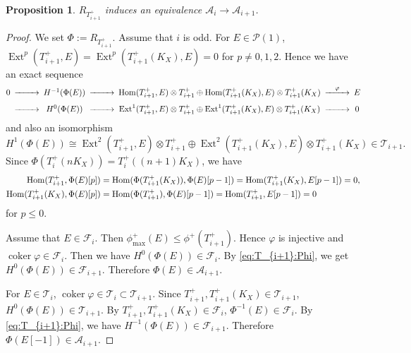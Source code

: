 \documentclass[leqno,11pt]{amsart}
\def\Ext{\mathop{\mathrm{Ext}}\nolimits}
\def\Hom{\mathop{\mathrm{Hom}}\nolimits}
\def\coker{\mathop{\mathrm{coker}}\nolimits}
\newtheorem{Prop}[Thm]{Proposition}
\theoremstyle{definition}
\def\AA{\ensuremath{\mathcal A}}
\def\FF{\ensuremath{\mathcal F}}
\def\PP{\ensuremath{\mathcal P}}
\def\TT{\ensuremath{\mathcal T}}
\begin{document}
\begin{Prop}\label{Prop:equiv1-2}
$R_{T_{i+1}^+}$ induces an equivalence
$\AA_i \to \AA_{i+1}$.
\end{Prop}

\begin{proof}
We set $\Phi:=R_{T_{i+1}^+}$.
Assume that $i$ is odd.
For $E \in \PP(1)$, 
$\Ext^p(T_{i+1}^+,E)=\Ext^p(T_{i+1}^+(K_X),E)=0$ for $p \ne 0,1,2$.
Hence we have an exact sequence
\begin{equation}
\begin{CD}
0 @>>> H^{-1}(\Phi(E)) @>>> \Hom(T_{i+1}^+,E) \otimes T_{i+1}^+ \oplus  
\Hom(T_{i+1}^+(K_X),E) \otimes T_{i+1}^+ (K_X) @>{\varphi}>> E \\
 @>>> H^0(\Phi(E)) @>>> \Ext^1(T_{i+1}^+,E) \otimes T_{i+1}^+ \oplus  
\Ext^1(T_{i+1}^+(K_X),E) \otimes T_{i+1}^+ (K_X) @>>> 0
\end{CD}
\end{equation}
and also an isomorphism
\begin{equation}
H^1(\Phi(E)) \cong \Ext^2(T_{i+1}^+,E) \otimes T_{i+1}^+\oplus  
\Ext^2(T_{i+1}^+(K_X),E) \otimes T_{i+1}^+ (K_X) \in \TT_{i+1}.
\end{equation}
Since $\Phi(T_i^+ (nK_X))=T_i^+((n+1)K_X)$, we have
\begin{equation}\label{eq:T_{i+1}:Phi}
\begin{split}
\Hom(T_{i+1}^+,\Phi(E)[p])& =\Hom(\Phi(T_{i+1}^+(K_X)),\Phi(E)[p-1])
=\Hom(T_{i+1}^+(K_X),E[p-1])=0,\\
\Hom(T_{i+1}^+(K_X),\Phi(E)[p])&=\Hom(\Phi(T_{i+1}^+),\Phi(E)[p-1])
=\Hom(T_{i+1}^+,E[p-1])=0
\end{split}
\end{equation}
for $p \leq 0$.

Assume that $E \in \FF_i$. Then
$\phi_{\max}^+(E) \leq \phi^+(T_{i+1}^+)$. Hence 
$\varphi$ is injective and $\coker \varphi \in \FF_i$. 
Then we have $H^0(\Phi(E)) \in \FF_i$.
By \eqref{eq:T_{i+1}:Phi}, we get
$H^0(\Phi(E)) \in \FF_{i+1}$.
Therefore $\Phi(E) \in \AA_{i+1}$.

For $E \in \TT_i$, 
$\coker \varphi \in \TT_i \subset \TT_{i+1}$.
Since $T_{i+1}^+, T_{i+1}^+ (K_X)\in \TT_{i+1}$,
$H^0(\Phi(E)) \in \TT_{i+1}$.
By $T_{i+1}^+,T_{i+1}^+(K_X) \in \FF_i$, $\Phi^{-1}(E) \in \FF_i$.
By \eqref{eq:T_{i+1}:Phi}, we have
$H^{-1}(\Phi(E)) \in \FF_{i+1}$.
Therefore $\Phi(E[-1]) \in \AA_{i+1}$.




\end{proof}
\end{document}
